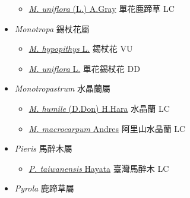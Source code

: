 \begin{itemize}
  \begin{itemize}
        \item[] \href{http://www.theplantlist.org/tpl1.1/search?q=Moneses+uniflora}{\textit{M. uniflora} (L.) A.Gray}   單花鹿蹄草   LC
  \end{itemize}
 \item[] \textit{Monotropa} 錫杖花屬
                                
  \begin{itemize}
        \item[] \href{http://www.theplantlist.org/tpl1.1/search?q=Monotropa+hypopithys}{\textit{M. hypopithys} L.}   錫杖花   VU
        \item[] \href{http://www.theplantlist.org/tpl1.1/search?q=Monotropa+uniflora}{\textit{M. uniflora} L.}   單花錫杖花   DD
  \end{itemize}
 \item[] \textit{Monotropastrum} 水晶蘭屬
                                
  \begin{itemize}
        \item[] \href{http://www.theplantlist.org/tpl1.1/search?q=Monotropastrum+humile}{\textit{M. humile} (D.Don) H.Hara}   水晶蘭   LC
        \item[] \href{http://www.theplantlist.org/tpl1.1/search?q=Monotropastrum+macrocarpum}{\textit{M. macrocarpum} Andres}   阿里山水晶蘭   LC
  \end{itemize}
 \item[] \textit{Pieris} 馬醉木屬
                                
  \begin{itemize}
        \item[] \href{http://www.theplantlist.org/tpl1.1/search?q=Pieris+taiwanensis}{\textit{P. taiwanensis} Hayata}   臺灣馬醉木   LC
  \end{itemize}
 \item[] \textit{Pyrola} 鹿蹄草屬
                                

\end{itemize}
